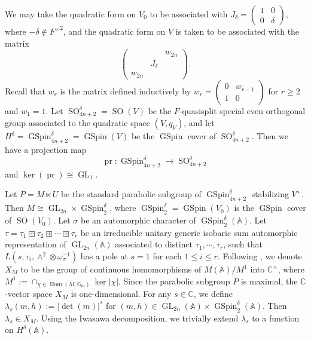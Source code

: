 \documentclass[12pt]{amsart}
\newcommand{\A}{\mathbb{A}}
\newcommand{\Hom}{\operatorname{Hom}}
\theoremstyle{remark}
\newcommand{\pr}{\operatorname{pr}}
\DeclareMathOperator{\GL}{GL}
\DeclareMathOperator{\SO}{SO}
\DeclareMathOperator{\GSpin}{GSpin}
\begin{document}
We may take the quadratic form on $V_0$ to be associated with $J_\delta=\left(\begin{smallmatrix} 1 &0\\ 0 &\delta\end{smallmatrix}\right)$, where $-\delta\not\in {F^\times}^2$, and the quadratic form on $V$ is taken to be associated with the matrix 
\begin{equation}
\label{eq-matrix-quad-form-on-V}
	\begin{pmatrix}
   &&w_{2n}\\
   &J_\delta&\\
   w_{2n}&&
  \end{pmatrix}.
\end{equation}
Recall that $w_{r}$ is the matrix defined inductively by $w_{r}=\left(\begin{smallmatrix} 0 & w_{r-1}\\ 1&0 \end{smallmatrix}\right)$ for $r\ge 2$ and $w_1=1$.
Let $\SO_{4n+2}^\delta=\SO(V)$ be the $F$-quasisplit special even orthogonal group associated to the quadratic space $(V, q_V)$, and let $H^\delta=\GSpin_{4n+2}^\delta=\GSpin(V)$ be the  $\GSpin$ cover of $\SO_{4n+2}^\delta$. Then we have a projection map
\begin{equation}
\label{eq-pr}
\pr:\GSpin_{4n+2}^\delta \to \SO_{4n+2}^\delta	
\end{equation} 
and $\ker(\pr)\cong \GL_1$.


Let $P=M\ltimes U$ be the standard parabolic subgroup of $\GSpin_{4n+2}^\delta$ stabilizing $V^+$. Then $M\cong \GL_{2n}\times \GSpin_2^\delta$, where $\GSpin_2^\delta=\GSpin(V_0)$ is the $\GSpin$ cover of $\SO(V_0)$. 
Let $\sigma$ be an automorphic character of $\GSpin^\delta_2(\A)$. Let $\tau=\tau_1\boxplus \tau_2\boxplus \cdots \boxplus \tau_r$ be an irreducible unitary generic isobaric sum automorphic representation of $\GL_{2n}(\A)$ associated to distinct $\tau_1, \cdots, \tau_r$, such that $L(s, \tau_i, \wedge^2\otimes\omega_{\sigma}^{-1})$ has a pole at $s=1$ for each $1\le i\le r$.   
Following \cite[\S I.1.4]{MoglinWaldspurger1995}, we denote $X_M $ to be the group of continuous homomorphisms of $M(\A)/M^1$ into $\mathbb{C}^\times$, where $M^1:=\cap_{\chi\in \Hom(M, \mathbb{G}_m)}\ker |\chi|$. Since the parabolic subgroup $P$ is maximal, the $\mathbb{C}$-vector space $X_M$ is one-dimensional. For any $s\in \mathbb{C}$, we define $\lambda_s(m,h):=|\det(m)|^s$ for $(m,h)\in \GL_{2n}(\A)\times \GSpin_2^\delta(\A)$.  Then  $\lambda_s\in X_M$. Using the Iwasawa decomposition, we trivially extend $\lambda_s$ to a function on $H^\delta(\A)$. 
\end{document}
